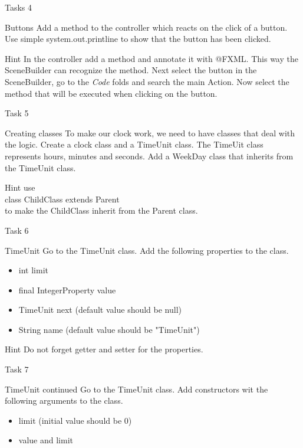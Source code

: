 \begin{frame}{Tasks 4}
\begin{block}{Buttons}
Add a method to the controller which reacts on the click of a button. Use simple system.out.printline to show that the button has been clicked. 
\end{block}
\pause
\begin{exampleblock}{Hint}
In the controller add a method and annotate it with @FXML. This way the SceneBuilder can recognize the method. Next select the button in the SceneBuilder, go to the \emph{Code} folds and search the main Action. Now select the method that will be executed when clicking on the button.
\end{exampleblock}
\end{frame}
\begin{frame}{Task 5}
\begin{block}{Creating classes}
To make our clock work, we need to have classes that deal with the logic. Create a clock class and a TimeUnit class. The TimeUit class represents hours, minutes and seconds. Add a WeekDay class that inherits from the TimeUnit class. 
\end{block}
\pause
\begin{exampleblock}{Hint}
use \\
class ChildClass extends Parent
\\ to make the ChildClass inherit from the Parent class.
\end{exampleblock}
\end{frame}
\begin{frame}{Task 6}
\begin{block}{TimeUnit}
Go to the TimeUnit class. Add the following properties to the class. 
 \begin{itemize}
 \item int limit
 \item final IntegerProperty value
 \item TimeUnit next (default value should be null)
 \item String name (default value should be "TimeUnit")
 \end{itemize}
\end{block}
\pause
\begin{exampleblock}{Hint}
Do not forget getter and setter for the properties.
\end{exampleblock}
\end{frame}
\begin{frame}{Task 7}
\begin{block}{TimeUnit continued}
Go to the TimeUnit class. Add constructors wit the following arguments to the class.  
 \begin{itemize}
 \item limit (initial value should be 0)
 \item value and limit
 \end{itemize}
\end{block}
\end{frame}
